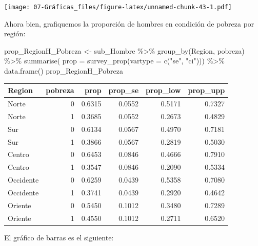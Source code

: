 \documentclass[
  12pt,
]{book}
\newenvironment{Shaded}{\begin{snugshade}}{\end{snugshade}}
\newcommand{\AttributeTok}[1]{\textcolor[rgb]{0.77,0.63,0.00}{#1}}
\newcommand{\FunctionTok}[1]{\textcolor[rgb]{0.00,0.00,0.00}{#1}}
\newcommand{\NormalTok}[1]{#1}
\newcommand{\OtherTok}[1]{\textcolor[rgb]{0.56,0.35,0.01}{#1}}
\newcommand{\SpecialCharTok}[1]{\textcolor[rgb]{0.00,0.00,0.00}{#1}}
\newcommand{\StringTok}[1]{\textcolor[rgb]{0.31,0.60,0.02}{#1}}
\begin{document}
\texttt{[image: 07-Gráficas\_files/figure-latex/unnamed-chunk-43-1.pdf]}

Ahora bien, grafiquemos la proporción de hombres en condición de pobreza por región:

\begin{Shaded}
\begin{Highlighting}[]
\NormalTok{prop\_RegionH\_Pobreza }\OtherTok{\textless{}{-}}\NormalTok{ sub\_Hombre }\SpecialCharTok{\%\textgreater{}\%}
  \FunctionTok{group\_by}\NormalTok{(Region, pobreza) }\SpecialCharTok{\%\textgreater{}\%}
  \FunctionTok{summarise}\NormalTok{(}
    \AttributeTok{prop =} \FunctionTok{survey\_prop}\NormalTok{(}\AttributeTok{vartype =} \FunctionTok{c}\NormalTok{(}\StringTok{"se"}\NormalTok{, }\StringTok{"ci"}\NormalTok{))) }\SpecialCharTok{\%\textgreater{}\%}
  \FunctionTok{data.frame}\NormalTok{()}
\NormalTok{prop\_RegionH\_Pobreza}
\end{Highlighting}
\end{Shaded}

\begin{tabular}{l|r|r|r|r|r}
\hline
Region & pobreza & prop & prop\_se & prop\_low & prop\_upp\\
\hline
Norte & 0 & 0.6315 & 0.0552 & 0.5171 & 0.7327\\
\hline
Norte & 1 & 0.3685 & 0.0552 & 0.2673 & 0.4829\\
\hline
Sur & 0 & 0.6134 & 0.0567 & 0.4970 & 0.7181\\
\hline
Sur & 1 & 0.3866 & 0.0567 & 0.2819 & 0.5030\\
\hline
Centro & 0 & 0.6453 & 0.0846 & 0.4666 & 0.7910\\
\hline
Centro & 1 & 0.3547 & 0.0846 & 0.2090 & 0.5334\\
\hline
Occidente & 0 & 0.6259 & 0.0439 & 0.5358 & 0.7080\\
\hline
Occidente & 1 & 0.3741 & 0.0439 & 0.2920 & 0.4642\\
\hline
Oriente & 0 & 0.5450 & 0.1012 & 0.3480 & 0.7289\\
\hline
Oriente & 1 & 0.4550 & 0.1012 & 0.2711 & 0.6520\\
\hline
\end{tabular}

El gráfico de barras es el siguiente:
\end{document}
